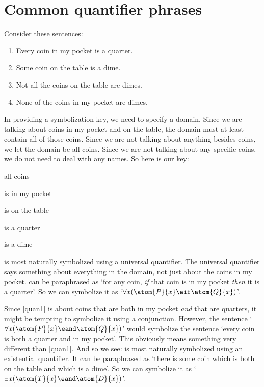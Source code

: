 

\section{Common quantifier phrases}
Consider these sentences:
	\begin{enumerate}
		\item\label{quan1} Every coin in my pocket is a quarter.
		\item\label{quan2} Some coin on the table is a dime.
		\item\label{quan3} Not all the coins on the table are dimes.
		\item\label{quan4} None of the coins in my pocket are dimes.
	\end{enumerate}
In providing a symbolization key, we need to specify a domain. Since we are talking about coins in my pocket and on the table, the domain must at least contain all of those coins. Since we are not talking about anything besides coins, we let the domain be all coins. Since we are not talking about any specific coins, we do not need to deal with any names. So here is our key:
	\begin{ekey}
		\item[\text{domain}] all coins
		\item[\atom{P}{x}]  is in my pocket
		\item[\atom{T}{x}]  is on the table
		\item[\atom{Q}{x}]  is a quarter
		\item[\atom{D}{x}]  is a dime
	\end{ekey}
 is most naturally symbolized using a universal quantifier. The universal quantifier says something about everything in the domain, not just about the coins in my pocket.  can be paraphrased as `for any coin, \emph{if} that coin is in my pocket \emph{then} it is a quarter'. So we can symbolize it as `$\forall x(\atom{P}{x} \eif \atom{Q}{x})$'.

Since \cref*{quan1} is about coins that are both in my pocket \emph{and} that are quarters, it might be tempting to symbolize it using a conjunction. However, the sentence `$\forall x(\atom{P}{x} \eand \atom{Q}{x})$' would symbolize the sentence `every coin is both a quarter and in my pocket'. This obviously means something very different than \cref*{quan1}. And so we see:
 is most naturally symbolized using an existential quantifier. It can be paraphrased as `there is some coin which is both on the table and which is a dime'. So we can symbolize it as `$\exists x(\atom{T}{x} \eand \atom{D}{x})$'.

